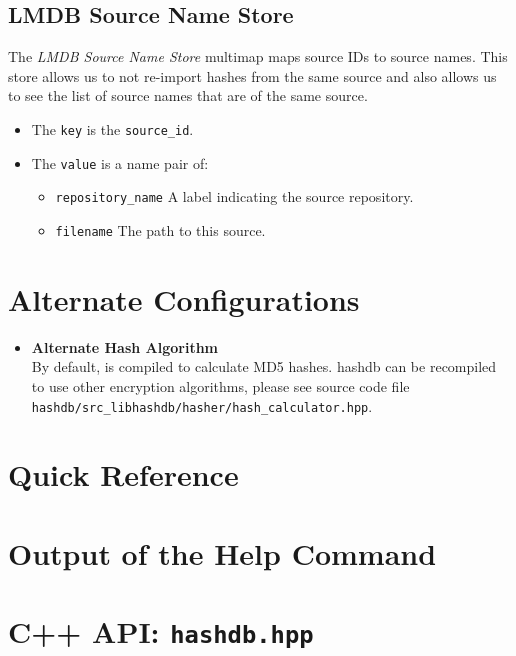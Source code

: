 \documentclass[11pt,fleqn]{article} %
\begin{document}
\subsection{LMDB Source Name Store}
The \textit{LMDB Source Name Store} multimap maps source IDs to source names.  This store allows us to not re-import hashes from the same source and also allows us to see the list of source names that are of the same source.
\begin{itemize}
\item The \verb+key+ is the \verb+source_id+.
\item The \verb+value+ is a name pair of:
  \begin{itemize}
  \item \verb+repository_name+ A label indicating the source repository.
  \item \verb+filename+ The path to this source.
  \end{itemize}
\end{itemize}

\section{Alternate Configurations}
\begin{itemize}
\item \textbf{Alternate Hash Algorithm}\\
By default, \hdb is compiled to calculate MD5 hashes. hashdb can be recompiled to use other encryption algorithms, please see source code file\\
\verb+hashdb/src_libhashdb/hasher/hash_calculator.hpp+.
\end{itemize}

 


\newpage
\appendix
\appendixpage

\section{\hdb Quick Reference}
\label{QuickReference}

\newpage

\section{Output of the \hdb Help Command}
\label{HelpOutput}
\begingroup
\footnotesize
{
\selectfont

}
\endgroup


\section{\hdb C++ API: \texttt{hashdb.hpp}}
\label{hashdbapi}
\lstset{language=C++}
\lstset{basicstyle=\footnotesize}
\lstset{breaklines=true}
\lstset{breakatwhitespace=true}

\end{document}
